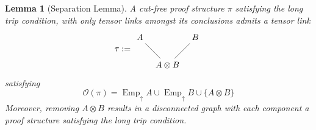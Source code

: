 \documentclass[12pt]{article}
\theoremstyle{plain}
\newtheorem{lemma}[thm]{Lemma}
\theoremstyle{definition}
\newcommand{\call}[1]{\mathcal{#1}}
\begin{document}
	\begin{lemma}[Separation Lemma]
		A cut-free proof structure $\pi$ satisfying the long trip condition, with only tensor links amongst its conclusions admits a tensor link
		\[
		\tau := \begin{tikzcd}[column sep = tiny]
			A\arrow[dr,dash] && B\arrow[dl,dash]\\
			& A \otimes B
		\end{tikzcd}
		\]
		satisfying
		\begin{equation}
			\call{O}(\pi) = \operatorname{Emp}_{\uparrow}A \cup \operatorname{Emp}_{\uparrow}B \cup \lbrace A \otimes B\rbrace
		\end{equation}
		Moreover, removing $A \otimes B$ results in a disconnected graph with each component a proof structure satisfying the long trip condition.
	\end{lemma}
\end{document}
